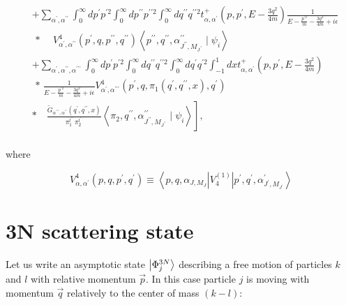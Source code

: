 \begin{equation}
\begin{aligned}
        & +\sum_{\alpha^{\prime}, \alpha^{\prime \prime}} \int_0^{\infty} d p^{\prime} p^{\prime 2} \int_0^{\infty} d p^{\prime \prime} p^{\prime \prime 2} \int_0^{\infty} d q^{\prime \prime} q^{\prime \prime 2} t_{\alpha, \alpha^{\prime}}^{+}\left(p, p^{\prime}, E-\frac{3 q^2}{4 m}\right) \frac{1}{E-\frac{p^{\prime 2}}{m}-\frac{3 q^2}{4 m}+i \epsilon} \\ & \text { * } \quad V_{\alpha^{\prime}, \alpha^{\prime \prime}}^4\left(p^{\prime}, q, p^{\prime \prime}, q^{\prime \prime}\right)\left\langle p^{\prime \prime}, q^{\prime \prime}, \alpha_{J^{\prime \prime}, M_{J^{\prime \prime}}}^{\prime \prime} \mid \psi_i\right\rangle \\ & +\sum_{\alpha^{\prime}, \alpha^{\prime \prime}, \alpha^{\prime \prime \prime}} \int_0^{\infty} d p^{\prime} p^{\prime 2} \int_0^{\infty} d q^{\prime \prime} q^{\prime \prime 2} \int_0^{\infty} d q^{\prime} q^{\prime 2} \int_{-1}^1 d x t_{\alpha, \alpha^{\prime}}^{+}\left(p, p^{\prime}, E-\frac{3 q^2}{4 m}\right) \\ & \text { * } \frac{1}{E-\frac{p^{\prime 2}}{m}-\frac{3 q^2}{4 m}+i \epsilon} V_{\alpha^{\prime}, \alpha^{\prime \prime \prime}}^4\left(p^{\prime}, q, \pi_1\left(q^{\prime}, q^{\prime \prime}, x\right), q^{\prime}\right) \\ & \left.* \quad \frac{\tilde{G}_{\alpha^{\prime \prime \prime}, \alpha^{\prime \prime}}\left(q^{\prime}, q^{\prime \prime}, x\right)}{\pi_1^{l^{\prime \prime \prime}} \pi_2^{l^{\prime \prime}}}\left\langle\pi_2, q^{\prime \prime}, \alpha_{J^{\prime \prime}, M_{J^{\prime \prime}}}^{\prime \prime} \mid \psi_i\right\rangle\right] \text {, } \\ & 
    \end{aligned}
\end{equation}

where

\begin{equation}
    V_{\alpha, \alpha^{\prime}}^4\left(p, q, p^{\prime}, q^{\prime}\right) \equiv\left\langle p, q, \alpha_{J, M_J}\left|V_4^{(1)}\right| p^{\prime}, q^{\prime}, \alpha_{J^{\prime}, M_{J^{\prime}}}^{\prime}\right\rangle
\end{equation}
    

\section{3N scattering state}

    Let us
    write an asymptotic state $\ket{\Phi^{3N}_j}$ describing a free motion
    of particles $k$ and $l$ with relative momentum $\vec{p}$. In this case
    particle $j$ is moving with momentum $\vec{q}$ relatively to the 
    center of mass $(k-l)$:
    
